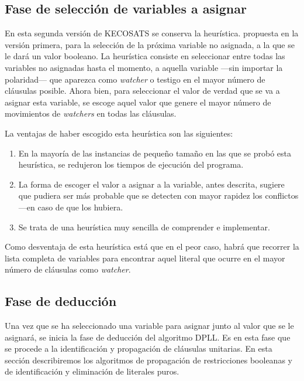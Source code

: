 \documentclass[12pt,lettersize,oneside]{article}
\begin{document}
\subsection{Fase de selección de variables a asignar}\label{ProxVariable}

En esta segunda versión de KECOSATS se conserva la heurística. propuesta en la
versión primera, para la selección de la próxima variable no asignada, a la que
se le dará un valor booleano. La heurística consiste en seleccionar entre todas
las variables no asignadas hasta el momento, a aquella variable ---sin importar
la polaridad--- que aparezca como \emph{watcher} o testigo en el mayor número de
cláusulas posible. Ahora bien, para seleccionar el valor de verdad que se va a
asignar esta variable, se escoge aquel valor que genere el mayor número de
movimientos de \emph{watchers} en todas las cláusulas.

La ventajas de haber escogido esta heurística son las siguientes:
\begin{enumerate}\vspace{-2.5mm}
\item En la mayoría de las instancias de pequeño tamaño en las que se probó esta
  heurística, se redujeron los tiempos de ejecución del programa.
\item La forma de escoger el valor a asignar a la variable, antes descrita,
  sugiere que pudiera ser más probable que se detecten con mayor rapidez los
  conflictos ---en caso de que los hubiera.
\item Se trata de una heurística muy sencilla de comprender e implementar.
\end{enumerate}

Como desventaja de esta heurística está que en el peor caso, habrá que recorrer
la lista completa de variables para encontrar aquel literal que ocurre en el
mayor número de cláusulas como \emph{watcher}.

\subsection{Fase de deducción}

Una vez que se ha seleccionado una variable para asignar junto al valor que se
le asignará, se inicia la fase de deducción del algoritmo DPLL. Es en esta fase
que se procede a la identificación y propagación de cláusulas unitarias. En esta
sección describiremos los algoritmos de propagación de restricciones booleanas y
de identificación y eliminación de literales puros.
\end{document}
